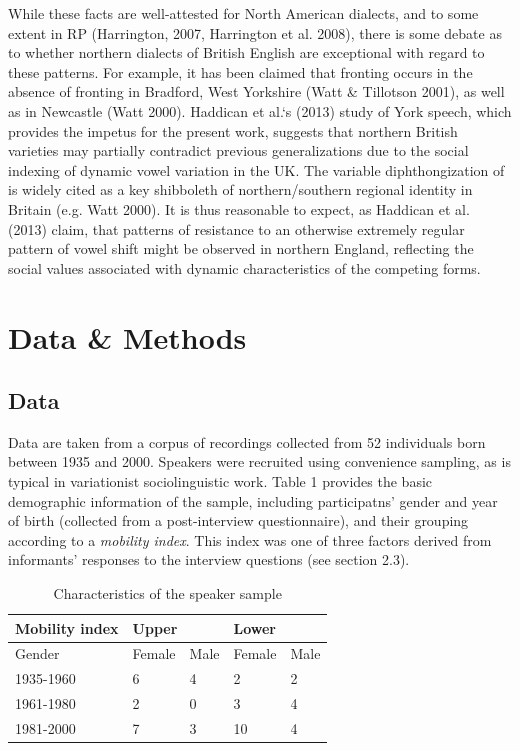 \documentclass[12pt]{article}
\begin{document}
While these facts are well-attested for North American dialects, and to some extent in RP (Harrington, 2007, Harrington et al. 2008), there is some debate as to whether northern dialects of British English are exceptional with regard to these patterns. For example, it has been claimed that  fronting occurs in the absence of  fronting in Bradford, West Yorkshire (Watt \& Tillotson 2001), as well as in Newcastle (Watt 2000). Haddican et al.`s (2013) study of York speech, which provides the impetus for the present work, suggests that northern British varieties may partially contradict previous generalizations due to the social indexing of dynamic vowel variation in the UK. The variable diphthongization of  is widely cited as a key shibboleth of northern/southern regional identity in Britain (e.g. Watt 2000). It is thus reasonable to expect, as Haddican et al. (2013) claim, that patterns of resistance to an otherwise extremely regular pattern of vowel shift might be observed in northern England, reflecting the social values associated with dynamic characteristics of the competing forms.

\section{Data \& Methods}

\subsection{Data}

Data are taken from a corpus of recordings collected from 52 individuals born between 1935 and 2000. Speakers were recruited using convenience sampling, as is typical in variationist sociolinguistic work. Table 1 provides the basic demographic information of the sample, including participatns' gender and year of birth (collected from a post-interview questionnaire), and their grouping according to a \textit{mobility index}. This index was one of three factors derived from informants' responses to the interview questions (see section 2.3).

\vspace*{6pt}
\begin{table}[htbp]
\centering
\begin{tabular}{l|l|l|l|l}
Mobility index&\multicolumn{2}{l|}{Upper}&\multicolumn{2}{l}{Lower}\\
\hline
Gender& Female& Male & Female & Male\\
\hline
1935-1960 & 6&4&2&2\\
 1961-1980& 2 &0&3&4\\
1981-2000&  7&3&10&4\\

\end{tabular}
\caption{Characteristics of the speaker sample}
\end{table}
\vspace*{6pt}
\end{document}
